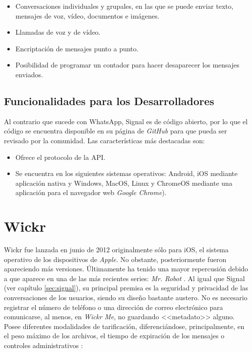 \begin{itemize}
	\item Conversaciones individuales y grupales, en las que se puede enviar texto, mensajes de voz, vídeo, documentos e imágenes.
	\item Llamadas de voz y de vídeo.
	\item Encriptación de mensajes punto a punto.
	\item Posibilidad de programar un contador para hacer desaparecer los mensajes enviados.
\end{itemize}

\subsection{Funcionalidades para los Desarrolladores}
Al contrario que sucede con WhatsApp, Signal es de código abierto, por lo que el código se encuentra disponible en su página de \textit{GitHub} para que pueda ser revisado por la comunidad. Las características más destacadas son:

\begin{itemize}
	\item Ofrece el protocolo de la \acs{API}.
	\item Se encuentra en los siguientes sistemas operativos: Android, iOS mediante aplicación nativa y Windows, MacOS, Linux y ChromeOS mediante una aplicación para el navegador web \textit{Google Chrome}).
\end{itemize}

\section{Wickr}
\label{sec:wickr}

Wickr fue lanzada en junio de 2012 originalmente sólo para iOS, el sistema operativo de los dispositivos de \textit{Apple}. No obstante, posteriormente fueron apareciendo más versiones. Últimamente ha tenido una mayor repercusión debido a que aparece en una de las más recientes series: \textit{Mr. Robot} \cite{Elio2016}. Al igual que Signal (ver capítulo \ref{sec:signal}), su principal premisa es la seguridad y privacidad de las conversaciones de los usuarios, siendo su diseño bastante austero. No es necesario registrar el número de teléfono o una dirección de correo electrónico para comunicarse, al menos, en \textit{Wickr Me}, no guardando <<metadato>> alguno. Posee diferentes modalidades de tarificación, diferenciándose, principalmente, en el peso máximo de los archivos, el tiempo de expiración de los mensajes o controles administrativos \cite{Wickr2017}:

